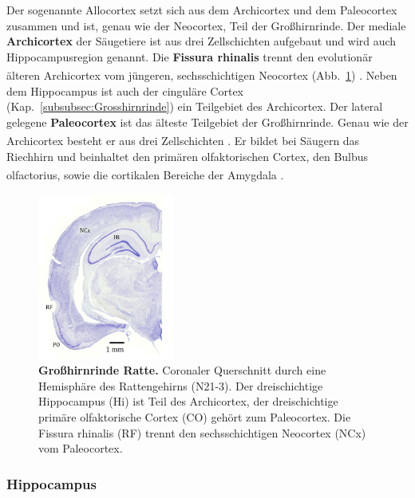 \documentclass[12pt,a4paper,pdftex]{article}
\begin{document}
Der sogenannte Allocortex setzt sich aus dem Archicortex und dem Paleocortex zusammen und ist, genau wie der Neocortex, Teil der Großhirnrinde. Der mediale \textbf{Archicortex} der Säugetiere ist aus drei Zellschichten aufgebaut und wird auch Hippocampusregion genannt. Die \textbf{Fissura rhinalis} trennt den evolutionär älteren Archicortex vom jüngeren, sechsschichtigen Neocortex (Abb.~\ref{fig:allocortex_ratte}) \textsuperscript{\cite[6]{storch2012lehrbuchzoo}}. Neben dem Hippocampus ist auch der cinguläre Cortex (Kap.~\ref{subsubsec:Grosshirnrinde}) ein Teilgebiet des Archicortex. Der lateral gelegene \textbf{Paleocortex} ist das älteste Teilgebiet der Großhirnrinde. Genau wie der Archicortex besteht er aus drei Zellschichten \textsuperscript{\cite[6]{storch2012lehrbuchzoo}}. Er bildet bei Säugern das Riechhirn und beinhaltet den primären olfaktorischen Cortex, den Bulbus olfactorius, sowie die cortikalen Bereiche der Amygdala \textsuperscript{\cite[9]{trepel2011neuroanatomie}}.

\begin{figure}[H]
    \centering
    \includegraphics[width=0.4\textwidth]{pictures/Bilder_Jule/Ratte/RF.png}
    \caption[Großhirnrinde Ratte]{\textbf{Großhirnrinde Ratte.} Coronaler Querschnitt durch eine Hemisphäre des Rattengehirns (N21-3). Der dreischichtige Hippocampus (Hi) ist Teil des Archicortex, der dreischichtige primäre olfaktorische Cortex (CO) gehört zum Paleocortex. Die Fissura rhinalis (RF) trennt den sechsschichtigen Neocortex (NCx) vom Paleocortex.}
    \label{fig:allocortex_ratte}
\end{figure}{}

\subsubsection*{Hippocampus}
\label{subsubsec:Hippocampus} 
\end{document}
